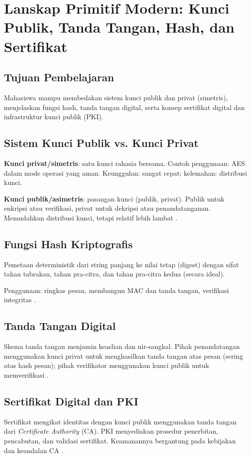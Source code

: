 \documentclass[../main.tex]{subfiles}
\begin{document}
\chapter{Lanskap Primitif Modern: Kunci Publik, Tanda Tangan, Hash, dan Sertifikat}

\section{Tujuan Pembelajaran}
Mahasiswa mampu membedakan sistem kunci publik dan privat (simetris), menjelaskan fungsi hash, tanda tangan digital, serta konsep sertifikat digital dan infrastruktur kunci publik (PKI).

\section{Sistem Kunci Publik vs. Kunci Privat}
\textbf{Kunci privat/simetris}: satu kunci rahasia bersama. Contoh penggunaan: AES dalam mode operasi yang aman. Keunggulan: sangat cepat; kelemahan: distribusi kunci.

\textbf{Kunci publik/asimetris}: pasangan kunci (publik, privat). Publik untuk enkripsi atau verifikasi, privat untuk dekripsi atau penandatanganan. Memudahkan distribusi kunci, tetapi relatif lebih lambat \citep{katzlindell,stallings}.

\section{Fungsi Hash Kriptografis}
\begin{definition}
Pemetaan deterministik dari string panjang ke nilai tetap (digest) dengan sifat tahan tabrakan, tahan pra-citra, dan tahan pra-citra kedua (secara ideal).
\end{definition}
Penggunaan: ringkas pesan, membangun MAC dan tanda tangan, verifikasi integritas \citep{menezes}.

\section{Tanda Tangan Digital}
Skema tanda tangan menjamin keaslian dan nir-sangkal. Pihak penandatangan menggunakan kunci privat untuk menghasilkan tanda tangan atas pesan (sering atas hash pesan); pihak verifikator menggunakan kunci publik untuk memverifikasi \citep{katzlindell}.

\section{Sertifikat Digital dan PKI}
Sertifikat mengikat identitas dengan kunci publik menggunakan tanda tangan dari \emph{Certificate Authority} (CA). PKI menyediakan prosedur penerbitan, pencabutan, dan validasi sertifikat. Keamanannya bergantung pada kebijakan dan keandalan CA \citep{stallings}.
\end{document}
